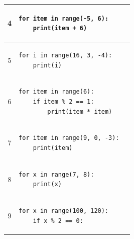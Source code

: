 \documentclass[14pt]{extarticle}
\begin{document}
{\begin{longtable}{|c|p{}|p{}|}
\hline
4 &
\begin{pycell}
\begin{english}
\begin{verbatim}
for item in range(-5, 6):
    print(item + 6)
\end{verbatim}
\end{english}
\end{pycell} & \rule{0pt}{1.3cm} \\
\hline
5 &
\begin{pycell}
\begin{english}
\begin{verbatim}
for i in range(16, 3, -4):
    print(i)
\end{verbatim}
\end{english}
\end{pycell} & \rule{0pt}{1.3cm} \\
\hline
6 &
\begin{pycell}
\begin{english}
\begin{verbatim}
for item in range(6):
    if item % 2 == 1:
        print(item * item)
\end{verbatim}
\end{english}
\end{pycell} & \rule{0pt}{1.3cm} \\
\hline
7 &
\begin{pycell}
\begin{english}
\begin{verbatim}
for item in range(9, 0, -3):
    print(item)
\end{verbatim}
\end{english}
\end{pycell} & \rule{0pt}{1.3cm} \\
\hline
8 &
\begin{pycell}
\begin{english}
\begin{verbatim}
for x in range(7, 8):
    print(x)
\end{verbatim}
\end{english}
\end{pycell} & \rule{0pt}{1.3cm} \\
\hline
9 &
\begin{pycell}
\begin{english}
\begin{verbatim}
for x in range(100, 120):
    if x % 2 == 0:

\end{verbatim}
\end{english}
\end{pycell}
\end{longtable}}
\end{document}
